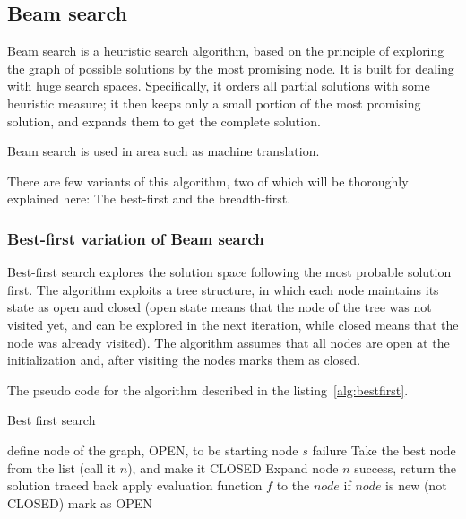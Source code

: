 \subsection{Beam search}

Beam search is a heuristic search algorithm, based on the principle of exploring the graph of possible solutions by the most promising node. It is built for dealing with huge search spaces. Specifically, it orders all partial solutions with some heuristic measure; it then keeps only a small portion of the most promising solution, and expands them to get the complete solution.

Beam search is used in area such as machine translation\cite{Koehn2007MOSEStranslationSystem}.


There are few variants of this algorithm, two of which will be thoroughly explained here: The best-first and the breadth-first. 

\subsubsection{Best-first variation of Beam search}

Best-first search explores the solution space following the most probable solution first. The algorithm exploits a tree structure, in which each node maintains its state as open and closed (open state means that the node of the tree was not visited yet, and can be explored in the next iteration, while closed means that the node was already visited). The algorithm assumes that all nodes are open at the initialization and, after visiting the nodes marks them as closed. 

The pseudo code for the algorithm described in the listing~\ref{alg:bestfirst}.


\begin{algorithm}
	\caption{Best first search}
	\label{alg:bestfirst}
	\begin{algorithmic}[1]
		\State define node of the graph, OPEN, to be starting node $s$
		\State	failure
		\EndIf
		\State Take the best node from the list (call it $n$), and make it CLOSED
		\State Expand node $n$
			\State	success, return the solution traced back
		\EndIf
		\State	apply evaluation function $f$ to the $node$\;
		\State	if $node$ is new (not CLOSED) mark as OPEN\;
		\EndFor
	\end{algorithmic}
\end{algorithm}


